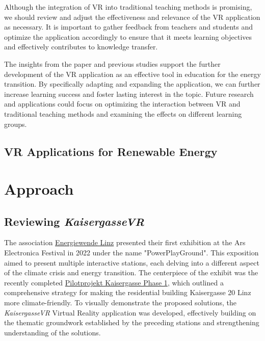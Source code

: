 \documentclass[draft, final]{vutinfth} %
\begin{document}
Although the integration of VR into traditional teaching methods is promising, we should review and adjust the effectiveness and relevance of the VR application as necessary. It is important to gather feedback from teachers and students and optimize the application accordingly to ensure that it meets learning objectives and effectively contributes to knowledge transfer.

The insights from the paper and previous studies support the further development of the VR application as an effective tool in education for the energy transition. By specifically adapting and expanding the application, we can further increase learning success and foster lasting interest in the topic. Future research and applications could focus on optimizing the interaction between VR and traditional teaching methods and examining the effects on different learning groups.


\section{VR Applications for Renewable Energy}


\chapter{Approach}
\section{Reviewing \textit{KaisergasseVR}}
The association \href{https://www.energiewende-linz.at}{Energiewende Linz} presented their first exhibition at the Ars Electronica Festival in 2022 under the name "PowerPlayGround". This exposition aimed to present multiple interactive stations, each delving into a different aspect of the climate crisis and energy transition. The centerpiece of the exhibit was the recently completed \href{https://www.pilotprojekt-kaisergasse.at/}{Pilotprojekt Kaisergasse Phase 1}, which outlined a comprehensive strategy for making the residential building Kaisergasse 20 Linz more climate-friendly. To visually demonstrate the proposed solutions, the \textit{KaisergasseVR} Virtual Reality application was developed, effectively building on the thematic groundwork established by the preceding stations and strengthening understanding of the solutions.
\end{document}
